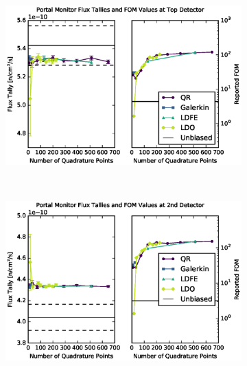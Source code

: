 \documentclass{article} %
\begin{document}
\begin{figure}[!htb]
\begin{subfigure}{\textwidth}
\centering
\includegraphics[max height=0.445\textheight]
{img/portal-fwcadis-1.eps}
\end{subfigure}
\\
\begin{subfigure}{\textwidth}
\centering
\includegraphics[max height=0.445\textheight]
{img/portal-fwcadis-2.eps}
\end{subfigure}
\end{figure}
\clearpage
\end{document}
